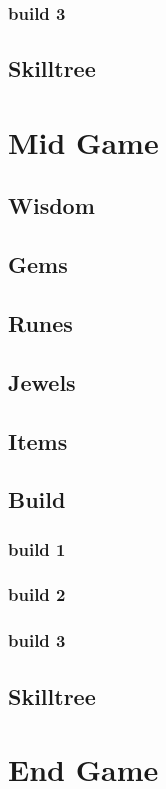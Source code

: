 \documentclass[14pt]{article}
\begin{document}
\subsubsection{build 3}

\subsection{Skilltree}


\newpage

\section{Mid Game}
\subsection{Wisdom}
\subsection{Gems}
\subsection{Runes}
\subsection{Jewels}
\subsection{Items}
\subsection{Build}
\subsubsection{build 1}
\subsubsection{build 2}
\subsubsection{build 3}
\subsection{Skilltree}

\newpage

\section{End Game}
\end{document}
